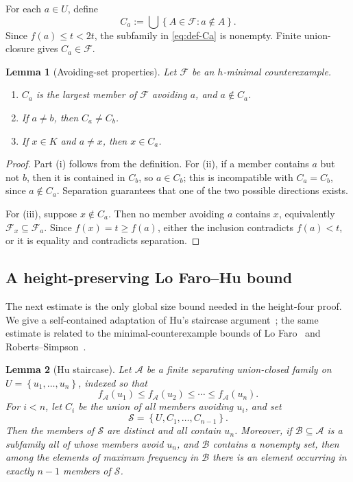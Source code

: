 \documentclass[11pt,reqno]{amsart}
\numberwithin{equation}{section}
\newtheorem{lemma}[lemma]{Lemma}
\theoremstyle{definition}
\theoremstyle{remark}
\newcommand{\F}{\mathcal{F}}
\newcommand{\A}{\mathcal{A}}
\newcommand{\1}{\mathbf{1}}
\newcommand{\set}[1]{\left\{#1\right\}}
\begin{document}
For each \(a\in U\), define
\begin{equation}\label{eq:def-Ca}
C_a:=\bigcup\set{A\in\F:a\notin A}.
\end{equation}
Since \(f(a)\le t<2t\), the subfamily in \cref{eq:def-Ca} is nonempty.  Finite union-closure gives \(C_a\in\F\).

\begin{lemma}[Avoiding-set properties]\label{lem:Ca-properties}
Let \(\F\) be an \(h\)-minimal counterexample.
\begin{enumerate}[label=\textup{(\roman*)},leftmargin=2.3em]
\item \(C_a\) is the largest member of \(\F\) avoiding \(a\), and \(a\notin C_a\).
\item If \(a\ne b\), then \(C_a\ne C_b\).
\item If \(x\in K\) and \(a\ne x\), then \(x\in C_a\).
\end{enumerate}
\end{lemma}

\begin{proof}
Part (i) follows from the definition.  For (ii), if a member contains \(a\) but not \(b\), then it is contained in \(C_b\), so \(a\in C_b\); this is incompatible with \(C_a=C_b\), since \(a\notin C_a\).  Separation guarantees that one of the two possible directions exists.

For (iii), suppose \(x\notin C_a\).  Then no member avoiding \(a\) contains \(x\), equivalently \(\F_x\subseteq\F_a\).  Since \(f(x)=t\ge f(a)\), either the inclusion contradicts \(f(a)<t\), or it is equality and contradicts separation.
\end{proof}

\subsection{A height-preserving Lo Faro--Hu bound}

The next estimate is the only global size bound needed in the height-four proof.  We give a self-contained adaptation of Hu's staircase argument~\cite{Hu}; the same estimate is related to the minimal-counterexample bounds of Lo Faro~\cite{LoFaro} and Roberts--Simpson~\cite{RobertsSimpson}.

\begin{lemma}[Hu staircase]\label{lem:hu-staircase}
Let \(\A\) be a finite separating union-closed family on
\(
U=\set{u_1,\dots,u_n}
\), indexed so that
\[
f_{\A}(u_1)\le f_{\A}(u_2)\le\cdots\le f_{\A}(u_n).
\]
For \(i<n\), let \(C_i\) be the union of all members avoiding \(u_i\), and set
\[
\mathcal S=\set{U,C_1,\dots,C_{n-1}}.
\]
Then the members of \(\mathcal S\) are distinct and all contain \(u_n\).  Moreover, if \(\mathcal B\subseteq\A\) is a subfamily all of whose members avoid \(u_n\), and \(\mathcal B\) contains a nonempty set, then among the elements of maximum frequency in \(\mathcal B\) there is an element occurring in exactly \(n-1\) members of \(\mathcal S\).
\end{lemma}
\end{document}
